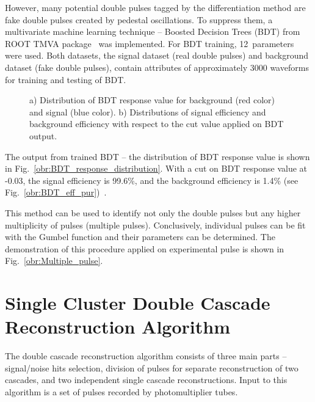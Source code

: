 \documentclass[a4paper,11pt]{article}
\begin{document}
However, many potential double pulses tagged by the differentiation method are fake double pulses created by pedestal oscillations. To suppress them, a multivariate machine learning technique -- Boosted Decision Trees (BDT) from ROOT TMVA package~\cite{Hoecker:TMVA:2007} was implemented. For BDT training, 12~parameters were used. Both datasets, the signal dataset (real double pulses) and background dataset (fake double pulses), contain attributes of approximately 3000 waveforms for training and testing of BDT.


\begin{figure}[h!]
	\centering
	\begin{multicols}{2}
		\centering
	\end{multicols}
	\caption{a) Distribution of BDT response value for background (red color) and signal (blue color). b) Distributions of signal efficiency and background efficiency with respect to the cut value applied on BDT output.~\cite{Eckerova:Thesis:2020} }
	\label{fig:BDT_results}
\end{figure}

The output from trained BDT -- the distribution of BDT response value is shown in Fig.~\ref{obr:BDT_response_distribution}. With a cut on BDT response value at -0.03, the signal efficiency is 99.6\%, and the background efficiency is 1.4\% (see Fig.~\ref{obr:BDT_eff_pur})~\cite{Eckerova:Thesis:2020}.

This method can be used to identify not only the double pulses but any higher multiplicity of pulses (multiple pulses). Conclusively, individual pulses can be fit with the Gumbel function and their parameters can be determined. The demonstration of this procedure applied on experimental pulse is shown in Fig.~\ref{obr:Multiple_pulse}.


\section{Single Cluster Double Cascade Reconstruction Algorithm}

The double cascade reconstruction algorithm consists of three main parts -- signal/noise hits selection, division of pulses for separate reconstruction of two cascades, and two independent single cascade reconstructions. Input to this algorithm is a set of pulses recorded by photomultiplier tubes.
\end{document}
